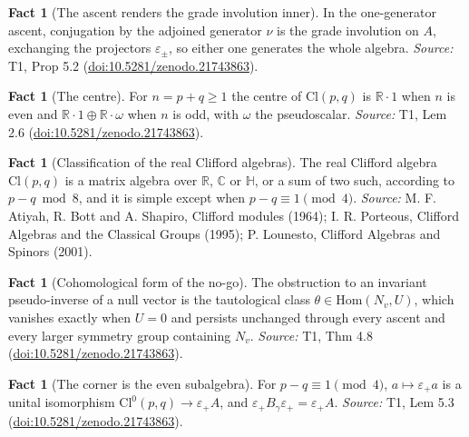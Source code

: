 \documentclass[11pt]{article}
\theoremstyle{definition}
\newtheorem{fact}[theorem]{Fact}
\theoremstyle{plain}
\providecommand{\C}{}\renewcommand{\C}{\mathbb{C}}
\providecommand{\Cl}{}\renewcommand{\Cl}{\mathrm{Cl}}
\providecommand{\HH}{}\renewcommand{\HH}{\mathbb{H}}
\providecommand{\R}{}\renewcommand{\R}{\mathbb{R}}
\begin{document}
\begin{fact}[The ascent renders the grade involution inner]\label{c:transport.ascent-renders-grade-involution-inner}
In the one-generator ascent, conjugation by the adjoined generator $\nu$ is the grade involution on $A$, exchanging the projectors $\varepsilon_\pm$, so either one generates the whole algebra.
\emph{Source:} T1, Prop 5.2 (\href{https://doi.org/10.5281/zenodo.21743863}{doi:10.5281/zenodo.21743863}).
\end{fact}

\begin{fact}[The centre]\label{c:transport.centre}
For $n = p + q \geq 1$ the centre of $\Cl(p,q)$ is $\R \cdot 1$ when $n$ is even and $\R \cdot 1 \oplus \R \cdot \omega$ when $n$ is odd, with $\omega$ the pseudoscalar.
\emph{Source:} T1, Lem 2.6 (\href{https://doi.org/10.5281/zenodo.21743863}{doi:10.5281/zenodo.21743863}).
\end{fact}

\begin{fact}[Classification of the real Clifford algebras]\label{c:transport.classification-real-clifford-algebras}
The real Clifford algebra $\Cl(p,q)$ is a matrix algebra over $\R$, $\C$ or $\HH$, or a sum of two such, according to $p - q \bmod 8$, and it is simple except when $p - q \equiv 1 \pmod 4$.
\emph{Source:} M. F. Atiyah, R. Bott and A. Shapiro, Clifford modules (1964); I. R. Porteous, Clifford Algebras and the Classical Groups (1995); P. Lounesto, Clifford Algebras and Spinors (2001).
\end{fact}

\begin{fact}[Cohomological form of the no-go]\label{c:transport.cohomological-form-no-go}
The obstruction to an invariant pseudo-inverse of a null vector is the tautological class $\theta \in \mathrm{Hom}(N_v, U)$, which vanishes exactly when $U = 0$ and persists unchanged through every ascent and every larger symmetry group containing $N_v$.
\emph{Source:} T1, Thm 4.8 (\href{https://doi.org/10.5281/zenodo.21743863}{doi:10.5281/zenodo.21743863}).
\end{fact}

\begin{fact}[The corner is the even subalgebra]\label{c:transport.corner-even-subalgebra}
For $p - q \equiv 1 \pmod 4$, $a \mapsto \varepsilon_+ a$ is a unital isomorphism $\Cl^{0}(p,q) \to \varepsilon_+ A$, and $\varepsilon_+ B_\gamma \varepsilon_+ = \varepsilon_+ A$.
\emph{Source:} T1, Lem 5.3 (\href{https://doi.org/10.5281/zenodo.21743863}{doi:10.5281/zenodo.21743863}).
\end{fact}
\end{document}
